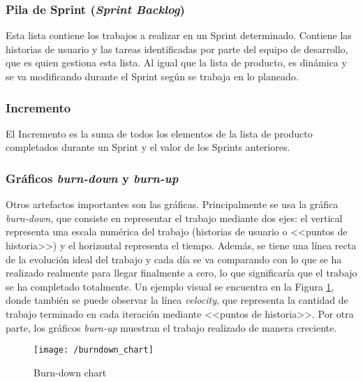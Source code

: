 \subsubsection{Pila de Sprint (\textit{Sprint Backlog})}
Esta lista \cite{Gomez2017} contiene los trabajos a realizar en un Sprint determinado. Contiene las historias de usuario y las tareas identificadas por parte del equipo de desarrollo, que es quien gestiona esta lista. Al igual que la lista de producto, es dinámica y se va modificando durante el Sprint según se trabaja en lo planeado.

\subsubsection{Incremento}
El Incremento \cite{Schwaber2017} es la suma de todos los elementos de la lista de producto completados durante un Sprint y el valor de los Sprints anteriores.

\subsubsection{Gráficos \textit{burn-down} y \textit{burn-up}}
Otros artefactos importantes son las gráficas. Principalmente se usa la gráfica \textit{burn-down}, que  consiste en representar el trabajo mediante dos ejes: el vertical representa una escala numérica del trabajo (historias de usuario o <<puntos de historia>>) y el horizontal representa el tiempo. Además, se tiene una línea recta de la evolución ideal del trabajo y cada día se va comparando con lo que se ha realizado realmente para llegar finalmente a cero, lo que significaría que el trabajo se ha completado totalmente. Un ejemplo visual se encuentra en la Figura \ref{fig:burndown}, donde también se puede observar la línea \textit{velocity}, que representa la cantidad de trabajo terminado en cada iteración mediante <<puntos de historia>>. Por otra parte, los gráficos \textit{burn-up} muestran el trabajo realizado de manera creciente.

\begin{figure}[!h]
	\begin{center}
		\texttt{[image: /burndown\_chart]}
		\caption{Burn-down chart}
		\label{fig:burndown}
	\end{center}
\end{figure}

\newpage

